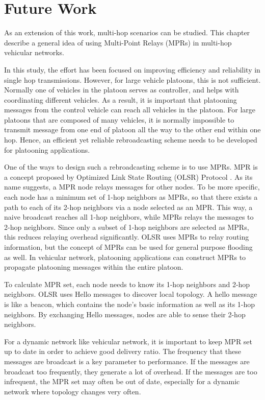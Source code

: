\documentclass[12pt]{report}
\begin{document}
\chapter{Future Work}

As an extension of this work, multi-hop scenarios can be studied. This chapter describe a general idea of using Multi-Point Relays (MPRs) in multi-hop vehicular networks.

In this study, the effort has been focused on improving efficiency and reliability in single hop transmissions. However, for large vehicle platoons, this is not sufficient. Normally one of vehicles in the platoon serves as controller, and helps with coordinating different vehicles. As a result, it is important that platooning messages from the control vehicle can reach all vehicles in the platoon. For large platoons that are composed of many vehicles, it is normally impossible to transmit message from one end of platoon all the way to the other end within one hop. Hence, an efficient yet reliable rebroadcasting scheme needs to be developed for platooning applications.

One of the ways to design such a rebroadcasting scheme is to use MPRs. MPR is a concept proposed by Optimized Link State Routing (OLSR) Protocol \cite{rfc3626}. As its name suggests, a MPR node relays messages for other nodes. To be more specific, each node has a minimum set of 1-hop neighbors as MPRs, so that there exists a path to each of its 2-hop neighbors via a node selected as an MPR. This way, a naive broadcast reaches all 1-hop neighbors, while MPRs relays the messages to 2-hop neighbors. Since only a subset of 1-hop neighbors are selected as MPRs, this reduces relaying overhead significantly. OLSR uses MPRs to relay routing information, but the concept of MPRs can be used for general purpose flooding as well. In vehicular network, platooning applications can construct MPRs to propagate platooning messages within the entire platoon.

To calculate MPR set, each node needs to know its 1-hop neighbors and 2-hop neighbors. OLSR uses Hello messages to discover local topology. A hello message is like a beacon, which contains the node's basic information as well as its 1-hop neighbors. By exchanging Hello messages, nodes are able to sense their 2-hop neighbors.

For a dynamic network like vehicular network, it is important to keep MPR set up to date in order to achieve good delivery ratio. The frequency that these messages are broadcast is a key parameter to performance. If the messages are broadcast too frequently, they generate a lot of overhead. If the messages are too infrequent, the MPR set may often be out of date, especially for a dynamic network where topology changes very often.
\end{document}
